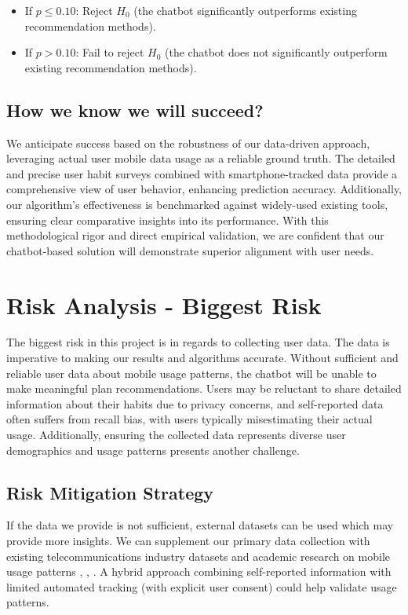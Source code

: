 \documentclass[conference]{IEEEtran}
\begin{document}
\begin{itemize}
\item If $p \leqslant 0.10$: Reject $H_0$ (the chatbot significantly outperforms existing recommendation methods).
\item If $p > 0.10$: Fail to reject $H_0$ (the chatbot does not significantly outperform existing recommendation methods).
\end{itemize}


\subsection{How we know we will succeed?}
We anticipate success based on the robustness of our data-driven approach, leveraging actual user mobile data usage as a reliable ground truth. The detailed and precise user habit surveys combined with smartphone-tracked data provide a comprehensive view of user behavior, enhancing prediction accuracy. Additionally, our algorithm's effectiveness is benchmarked against widely-used existing tools, ensuring clear comparative insights into its performance. With this methodological rigor and direct empirical validation, we are confident that our chatbot-based solution will demonstrate superior alignment with user needs.

\section{Risk Analysis - Biggest Risk}
The biggest risk in this project is in regards to collecting user data. The data is imperative to making our results and algorithms accurate. Without sufficient and reliable user data about mobile usage patterns, the chatbot will be unable to make meaningful plan recommendations. Users may be reluctant to share detailed information about their habits due to privacy concerns, and self-reported data often suffers from recall bias, with users typically misestimating their actual usage. Additionally, ensuring the collected data represents diverse user demographics and usage patterns presents another challenge.

\subsection{Risk Mitigation Strategy}
If the data we provide is not sufficient, external datasets can be used which may provide more insights. We can supplement our primary data collection with existing telecommunications industry datasets and academic research on mobile usage patterns \cite{b24}, \cite{b25}, \cite{b26}. A hybrid approach combining self-reported information with limited automated tracking (with explicit user consent) could help validate usage patterns. 
\end{document}

